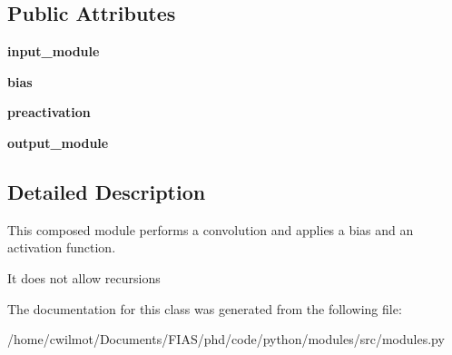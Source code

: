 \subsection*{Public Attributes}
\begin{DoxyCompactItemize}
\item 
\mbox{\label{classmodules_1_1_convolutional_layer_module_aa63060498756e70cf6b9c735c35d9dbd}} 
{\bfseries input\+\_\+module}
\item 
\mbox{\label{classmodules_1_1_convolutional_layer_module_ad26604b43fb51440c378aac5b8d0cfe4}} 
{\bfseries bias}
\item 
\mbox{\label{classmodules_1_1_convolutional_layer_module_a2d61b622c129b7608c76070de958560e}} 
{\bfseries preactivation}
\item 
\mbox{\label{classmodules_1_1_convolutional_layer_module_a12317713722fd8c7e760c509ea83c214}} 
{\bfseries output\+\_\+module}
\end{DoxyCompactItemize}


\subsection{Detailed Description}
This composed module performs a convolution and applies a bias and an activation function. 

It does not allow recursions 

The documentation for this class was generated from the following file\+:\begin{DoxyCompactItemize}
\item 
/home/cwilmot/\+Documents/\+F\+I\+A\+S/phd/code/python/modules/src/modules.\+py\end{DoxyCompactItemize}
